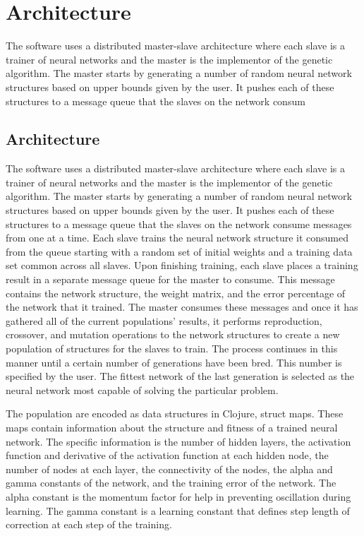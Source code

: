 \chapter[Architecture]{Architecture}
The software uses a distributed master-slave architecture where each slave is a trainer of neural networks and the master is the implementor of the genetic algorithm. The master starts by generating a number of random neural network structures based on upper bounds given by the user. It pushes each of these structures to a message queue that the slaves on the network consum\section{Architecture}
The software uses a distributed master-slave architecture where each slave is a trainer of neural networks and the master is the implementor of the genetic algorithm. The master starts by generating a number of random neural network structures based on upper bounds given by the user. It pushes each of these structures to a message queue that the slaves on the network consume messages from one at a time. Each slave trains the neural network structure it consumed from the queue starting with a random set of initial weights and a training data set common across all slaves. Upon finishing training, each slave places a training result in a separate message queue for the master to consume. This message contains the network structure, the weight matrix, and the error percentage of the network that it trained. The master consumes these messages and once it has gathered all of the current populations' results, it performs reproduction, crossover, and mutation operations to the network structures to create a new population of structures for the slaves to train. The process continues in this manner until a certain number of generations have been bred. This number is specified by the user. The fittest network of the last generation is selected as the neural network most capable of solving the particular problem.  

The population are encoded as data structures in Clojure, struct maps. These maps contain information about the structure and fitness of a trained neural network. The specific information is the number of hidden layers, the activation function and derivative of the activation function at each hidden node, the number of nodes at each layer, the connectivity of the nodes, the alpha and gamma constants of the network, and the training error of the network. The alpha constant is the momentum factor for help in preventing oscillation during learning. The gamma constant is a learning constant that defines step length of correction at each step of the training.

